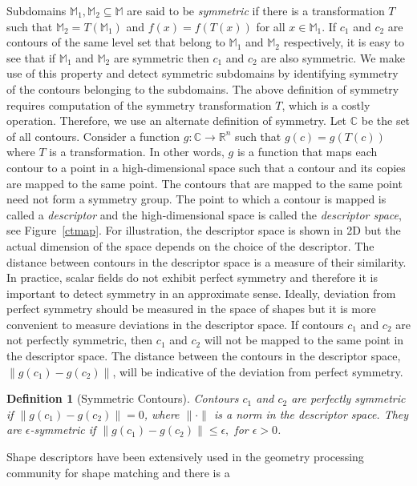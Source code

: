 \documentclass[review,journal]{vgtc}         %
\newtheorem*{defi}{Definition}
\begin{document}
Subdomains $\mathbb{M}_1, \mathbb{M}_2 \subseteq \mathbb{M}$ are said to be \emph{symmetric} 
if there is a transformation $T$ such that ${\mathbb{M}_2=T(\mathbb{M}_1)}$ and 
${f(x)=f(T(x))}$ for all $x \in \mathbb{M}_1$. If $c_1$ and $c_2$ are contours of the same level
set that belong to $\mathbb{M}_1$ and $\mathbb{M}_2$ respectively, it is easy to see that if 
$\mathbb{M}_1$ and $\mathbb{M}_2$ are symmetric then $c_1$ and $c_2$ are also symmetric. 
We make use of this property and detect symmetric subdomains by identifying symmetry of the 
contours belonging to the subdomains. The above definition of symmetry requires computation of the symmetry 
transformation $T$, which is a costly operation. Therefore, we use an alternate definition of symmetry.
Let $\mathbb{C}$ be the set of all contours. 
Consider a function $g : \mathbb{C} \rightarrow \mathbb{R}^n$ such that $g(c) = g(T(c))$
where $T$ is a transformation. In other words, $g$ is a function that maps each
contour to a point in a high-dimensional space such that a contour and its 
copies are mapped to the same point. {\color{blue}The contours that are mapped to the same
point need not form a symmetry group.} The point to which a contour is mapped is called a 
\emph{descriptor} and the high-dimensional space is called the \emph{descriptor space}, see Figure~\ref{ctmap}. 
For illustration, the descriptor space is shown in 2D but the actual dimension of the space
depends on the choice of the descriptor. The distance between contours in the descriptor space is a
measure of their similarity. In practice, scalar fields do not exhibit perfect symmetry and therefore
it is important to detect symmetry in an approximate sense. Ideally, deviation
from perfect symmetry should be measured in the space of shapes but 
it is more convenient to measure deviations in the descriptor space. If contours $c_1$ and 
$c_2$ are not perfectly symmetric, then $c_1$ and $c_2$ will not be mapped
to the same point in the descriptor space. The distance between
the contours in the descriptor space, $\lVert g(c_1)-g(c_2) \rVert$, will be indicative
of the deviation from perfect symmetry. 
\begin{defi}[Symmetric Contours]
Contours $c_1$ and $c_2$ are perfectly symmetric if $\lVert g(c_1)-g(c_2) \rVert = 0$,
where $\lVert \cdot \rVert$ is a norm in the descriptor space. They are 
{$\epsilon$-symmetric} if $\lVert g(c_1)-g(c_2) \rVert \leq \epsilon,$ for $\epsilon > 0$.
\end{defi}
Shape descriptors have been extensively used in the
geometry processing community for shape matching and there is a
\end{document}
